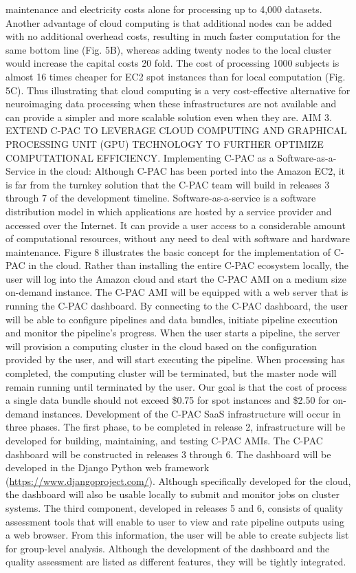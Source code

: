 \documentclass[1p,11pt]{elsarticle}
\begin{document}
maintenance and electricity costs alone for processing
up to 4,000 datasets. Another advantage of cloud
computing is that additional nodes can be added with no
additional overhead costs, resulting in much faster
computation for the same bottom line (Fig. 5B), whereas
adding twenty nodes to the local cluster would increase
the capital costs 20 fold. The cost of processing 1000
subjects is almost 16 times cheaper for EC2 spot
instances than for local computation (Fig. 5C). Thus
illustrating that cloud computing is a very
cost-effective alternative for neuroimaging data
processing when these infrastructures are not available
and can provide a simpler and more scalable solution
even when they are.  AIM 3. EXTEND C-PAC TO LEVERAGE
CLOUD COMPUTING AND GRAPHICAL PROCESSING UNIT (GPU)
TECHNOLOGY TO FURTHER OPTIMIZE COMPUTATIONAL EFFICIENCY.
Implementing C-PAC as a Software-as-a-Service in the
cloud: Although C-PAC has been ported into the Amazon
EC2, it is far from the turnkey solution that the C-PAC
team will build in releases 3 through 7 of the
development timeline. Software-as-a-service is a
software distribution model in which applications are
hosted by a service provider and accessed over the
Internet. It can provide a user access to a considerable
amount of computational resources, without any need to
deal with software and hardware maintenance. Figure 8
illustrates the basic concept for the implementation of
C-PAC in the cloud. Rather than installing the entire
C-PAC ecosystem locally, the user will log into the
Amazon cloud and start the C-PAC AMI on a medium size
on-demand instance. The C-PAC AMI will be equipped with
a web server that is running the C-PAC dashboard. By
connecting to the C-PAC dashboard, the user will be able
to configure pipelines and data bundles, initiate
pipeline execution and monitor the pipeline’s progress.
When the user starts a pipeline, the server will
provision a computing cluster in the cloud based on the
configuration provided by the user, and will start
executing the pipeline. When processing has completed,
the computing cluster will be terminated, but the master
		node will remain running until terminated by the user.
		Our goal is that the cost of process a single data
		bundle should not exceed \$0.75 for spot instances and
		\$2.50 for on-demand instances.  Development of the C-PAC
		SaaS infrastructure will occur in three phases. The
		first phase, to be completed in release 2,
		infrastructure will be developed for building,
		maintaining, and testing C-PAC AMIs. The C-PAC dashboard
		will be constructed in releases 3 through 6. The
		dashboard will be developed in the Django Python web
		framework (\url{https://www.djangoproject.com/}). Although
		specifically developed for the cloud, the dashboard will
		also be usable locally to submit and monitor jobs on
		cluster systems. The third component, developed in
		releases 5 and 6, consists of quality assessment tools
		that will enable to user to view and rate pipeline
		outputs using a web browser. From this information, the
		user will be able to create subjects list for
		group-level analysis. Although the development of the
		dashboard and the quality assessment are listed as
		different features, they will be tightly integrated.
\end{document}

